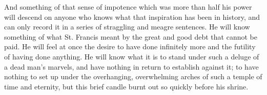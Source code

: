 \documentclass{book}
\begin{document}
And something of that sense of impotence which was more than half his power will descend on anyone who knows what that inspiration has been in history, and can only record it in a series of straggling and meagre sentences. He will know something of what St. Francis meant by the great and good debt that cannot be paid. He will feel at once the desire to have done infinitely more and the futility of having done anything. He will know what it is to stand under such a deluge of a dead man’s marvels, and have nothing in return to establish against it; to have nothing to set up under the overhanging, overwhelming arches of such a temple of time and eternity, but this brief candle burnt out so quickly before his shrine.
\end{document}
